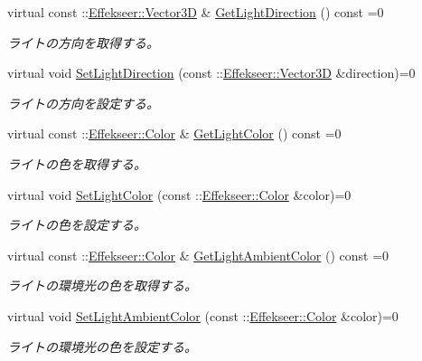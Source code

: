 \begin{DoxyCompactItemize}
virtual const \+::\mbox{\hyperlink{struct_effekseer_1_1_vector3_d}{Effekseer\+::\+Vector3D}} \& \mbox{\hyperlink{class_effekseer_renderer_1_1_renderer_a3da04ff6d2ad2a0126a7476703a7c019}{Get\+Light\+Direction}} () const =0
\begin{DoxyCompactList}\small\item\em ライトの方向を取得する。 \end{DoxyCompactList}\item 
virtual void \mbox{\hyperlink{class_effekseer_renderer_1_1_renderer_a04a843a79d80bd1f7e31f43dc4c62fd6}{Set\+Light\+Direction}} (const \+::\mbox{\hyperlink{struct_effekseer_1_1_vector3_d}{Effekseer\+::\+Vector3D}} \&direction)=0
\begin{DoxyCompactList}\small\item\em ライトの方向を設定する。 \end{DoxyCompactList}\item 
virtual const \+::\mbox{\hyperlink{struct_effekseer_1_1_color}{Effekseer\+::\+Color}} \& \mbox{\hyperlink{class_effekseer_renderer_1_1_renderer_af1ed44772dd362bd7dbed42823da0411}{Get\+Light\+Color}} () const =0
\begin{DoxyCompactList}\small\item\em ライトの色を取得する。 \end{DoxyCompactList}\item 
virtual void \mbox{\hyperlink{class_effekseer_renderer_1_1_renderer_a9ae2ce450679931644df1f603286835b}{Set\+Light\+Color}} (const \+::\mbox{\hyperlink{struct_effekseer_1_1_color}{Effekseer\+::\+Color}} \&color)=0
\begin{DoxyCompactList}\small\item\em ライトの色を設定する。 \end{DoxyCompactList}\item 
virtual const \+::\mbox{\hyperlink{struct_effekseer_1_1_color}{Effekseer\+::\+Color}} \& \mbox{\hyperlink{class_effekseer_renderer_1_1_renderer_a1454194ae4005f7a9d5a66f4f56c4972}{Get\+Light\+Ambient\+Color}} () const =0
\begin{DoxyCompactList}\small\item\em ライトの環境光の色を取得する。 \end{DoxyCompactList}\item 
virtual void \mbox{\hyperlink{class_effekseer_renderer_1_1_renderer_a8c177a08c1765e8a02ba72fae7b33935}{Set\+Light\+Ambient\+Color}} (const \+::\mbox{\hyperlink{struct_effekseer_1_1_color}{Effekseer\+::\+Color}} \&color)=0
\begin{DoxyCompactList}\small\item\em ライトの環境光の色を設定する。 \end{DoxyCompactList}\item 

\end{DoxyCompactItemize}
